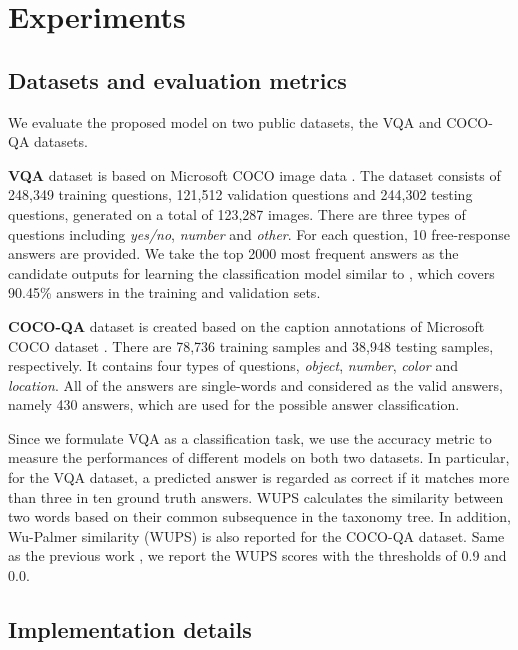 \documentclass[letterpaper]{article}
\begin{document}
{\section{Experiments}


\subsection{Datasets and evaluation metrics}

We evaluate the proposed model on two public datasets, the VQA \cite{antol2015vqa} and COCO-QA \cite{ren2015exploring} datasets.

\textbf{VQA} dataset \cite{antol2015vqa} is based on Microsoft COCO image data \cite{lin2014microsoft}.
The dataset consists of 248,349 training questions, 121,512 validation questions and 244,302 testing questions, generated on a total of 123,287 images. There are three types of questions including \textit{yes/no}, \textit{number} and \textit{other}. For each question, 10 free-response answers are provided. We take the top 2000 most frequent answers as the candidate outputs for learning the classification model similar to \cite{kim2016multimodal}, which covers 90.45\% answers in the training and validation sets.

\textbf{COCO-QA} dataset \cite{ren2015exploring} is created based on the caption annotations of Microsoft COCO dataset \cite{lin2014microsoft}. There are 78,736 training samples and 38,948 testing samples, respectively. It contains four types of questions, \textit{object}, \textit{number}, \textit{color} and \textit{location}. All of the answers are single-words and considered as the valid answers, namely 430 answers, which are used for the possible answer classification.

Since we formulate VQA as a classification task, we use the accuracy metric to measure the performances of different models on both two datasets. In particular, for the VQA dataset, a predicted answer is regarded as correct if it matches more than three in ten ground truth answers. WUPS calculates the similarity between two words based on their common subsequence in the taxonomy tree. In addition, Wu-Palmer similarity (WUPS) \cite{wu1994verbs} is also reported for the COCO-QA dataset. Same as the previous work \cite{lu2016hierarchical,li2016visual}, we report the WUPS scores with the thresholds of 0.9 and 0.0.



\subsection{Implementation details}


}
\end{document}
